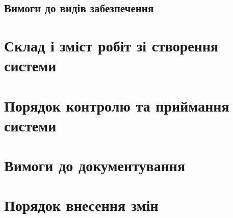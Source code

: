 \documentclass[
	a4paper,
	oneside,
	BCOR = 10mm,
	DIV = 12,
	12pt,
	headings = normal,
]{scrartcl}
\begin{document}
		\subsection{Вимоги до видів забезпечення}
		
	\section{Склад і зміст робіт зі створення системи}

	\section{Порядок контролю та приймання системи}

	\section{Вимоги до документування}

	\section{Порядок внесення змін}
\end{document}
